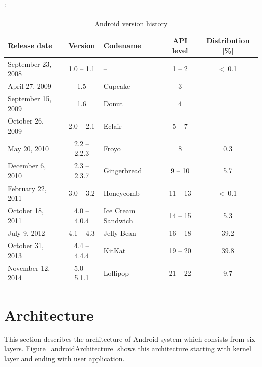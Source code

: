 \begin {table}[h!]
    \catcode`
    \begin{tabular}{|l|c|l|c|c|}
        \hline
        \textbf{Release date} &
        \textbf{Version} &
        \textbf{Codename} &
        \textbf{API level} &
        \multicolumn{1}{p{2.3cm}|}{\centering \textbf{Distribution} [\%]} \\ \hline \hline
        September 23, 2008 & 1.0 -- 1.1   & --                 & 1 -- 2   & \textless~0.1       \\ \cline{1-4}
        April 27, 2009     & 1.5          & Cupcake            & 3        &                     \\ \cline{1-4}
        September 15, 2009 & 1.6          & Donut              & 4        &                     \\ \cline{1-4}
        October 26, 2009   & 2.0 -- 2.1   & Eclair             & 5 -- 7   &                     \\ \hline
        May 20, 2010       & 2.2 -- 2.2.3 & Froyo              & 8        & 0.3                 \\ \hline
        December 6, 2010   & 2.3 -- 2.3.7 & Gingerbread        & 9 -- 10  & 5.7                 \\ \hline
        February 22, 2011  & 3.0 -- 3.2   & Honeycomb          & 11 -- 13 & \textless~0.1       \\ \hline
        October 18, 2011   & 4.0 -- 4.0.4 & Ice Cream Sandwich & 14 -- 15 & 5.3                 \\ \hline
        July 9, 2012       & 4.1 -- 4.3   & Jelly Bean         & 16 -- 18 & 39.2                \\ \hline
        October 31, 2013   & 4.4 -- 4.4.4 & KitKat             & 19 -- 20 & 39.8                \\ \hline
        November 12, 2014  & 5.0 -- 5.1.1 & Lollipop           & 21 -- 22 & 9.7                 \\ \hline
    \end{tabular}
    \centering
    \caption{Android version history \cite{Dashboards}}
    \label{AndroidHistoryTable}
\end{table}

\section{Architecture}\label{AndroidArchitecture}
This section describes the architecture of Android system \cite{AndroidDevBook} which consists from six layers. Figure~\ref{androidArchitecture} shows this architecture starting with kernel layer and ending with user application.

